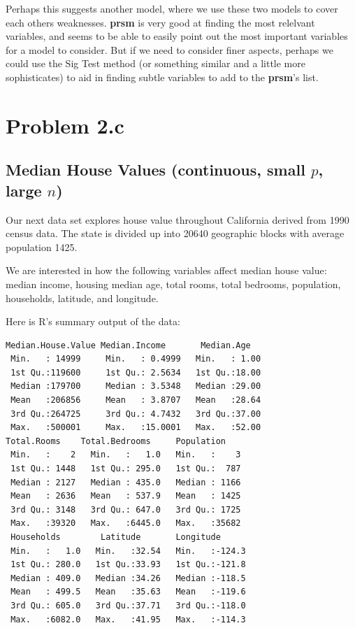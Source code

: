 \documentclass[letter]{article}
\begin{document}
Perhaps this suggests another model, where we use these two models to cover each others weaknesses. \textbf{prsm} is very good at finding the most relelvant variables, and seems to be able to easily point out the most important variables for a model to consider. But if we need to consider finer aspects, perhaps we could use the Sig Test method (or something similar and a little more sophisticates) to aid in finding subtle variables to add to the \textbf{prsm}'s list.



\section*{Problem 2.c}


\subsection*{Median House Values \cite{cadata} (continuous, small $p$, large $n$)}
Our next data set explores house value throughout California derived from 1990 census data. The state is divided up into 20640 geographic blocks with average population 1425.

We are interested in how the following variables affect median house value: median income, housing median age, total rooms, total bedrooms, population, households, latitude, and longitude.

Here is R's summary output of the data:
\begin{verbatim}
Median.House.Value Median.Income       Median.Age   
 Min.   : 14999     Min.   : 0.4999   Min.   : 1.00  
 1st Qu.:119600     1st Qu.: 2.5634   1st Qu.:18.00  
 Median :179700     Median : 3.5348   Median :29.00  
 Mean   :206856     Mean   : 3.8707   Mean   :28.64  
 3rd Qu.:264725     3rd Qu.: 4.7432   3rd Qu.:37.00  
 Max.   :500001     Max.   :15.0001   Max.   :52.00
Total.Rooms    Total.Bedrooms     Population   
 Min.   :    2   Min.   :   1.0   Min.   :    3  
 1st Qu.: 1448   1st Qu.: 295.0   1st Qu.:  787  
 Median : 2127   Median : 435.0   Median : 1166  
 Mean   : 2636   Mean   : 537.9   Mean   : 1425  
 3rd Qu.: 3148   3rd Qu.: 647.0   3rd Qu.: 1725  
 Max.   :39320   Max.   :6445.0   Max.   :35682
 Households        Latitude       Longitude     
 Min.   :   1.0   Min.   :32.54   Min.   :-124.3  
 1st Qu.: 280.0   1st Qu.:33.93   1st Qu.:-121.8  
 Median : 409.0   Median :34.26   Median :-118.5  
 Mean   : 499.5   Mean   :35.63   Mean   :-119.6  
 3rd Qu.: 605.0   3rd Qu.:37.71   3rd Qu.:-118.0  
 Max.   :6082.0   Max.   :41.95   Max.   :-114.3  
 \end{verbatim}
\end{document}
